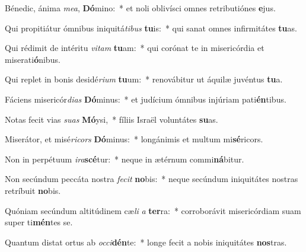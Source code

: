 \item Bénedic, ánima \textit{me}\textit{a}, \textbf{Dó}mino:~* et noli oblivísci omnes retributiónes \textbf{e}jus.
\item Qui propitiátur ómnibus iniquitá\textit{ti}\textit{bus} \textbf{tu}is:~* qui sanat omnes infirmitátes \textbf{tu}as.
\item Qui rédimit de intéritu \textit{vi}\textit{tam} \textbf{tu}am:~* qui corónat te in misericórdia et miserati\textbf{ó}nibus.
\item Qui replet in bonis desidé\textit{ri}\textit{um} \textbf{tu}um:~* renovábitur ut áquilæ juvéntus \textbf{tu}a.
\item Fáciens misericór\textit{di}\textit{as} \textbf{Dó}minus:~* et judícium ómnibus injúriam pati\textbf{én}tibus.
\item Notas fecit vias \textit{su}\textit{as} \textbf{Mó}ysi,~* fíliis Israël voluntátes \textbf{su}as.
\item Miserátor, et misé\textit{ri}\textit{cors} \textbf{Dó}minus:~* longánimis et multum mi\textbf{sé}ricors.
\item Non in perpétuum \textit{i}\textit{ra}\textbf{scé}tur:~* neque in ætérnum commi\textbf{ná}bitur.
\item Non secúndum peccáta nostra \textit{fe}\textit{cit} \textbf{no}bis:~* neque secúndum iniquitátes nostras retríbuit \textbf{no}bis.
\item Quóniam secúndum altitúdinem cæ\textit{li} \textit{a} \textbf{ter}ra:~* corroborávit misericórdiam suam super ti\textbf{mén}tes se.
\item Quantum distat ortus ab \textit{oc}\textit{ci}\textbf{dén}te:~* longe fecit a nobis iniquitátes \textbf{nos}tras.
